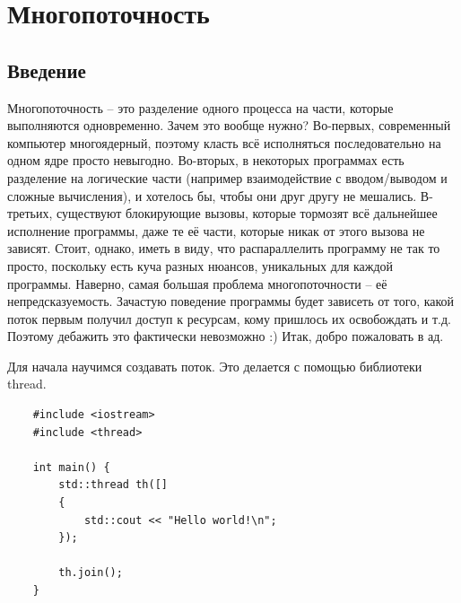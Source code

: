 \documentclass[12pt, a4paper]{article}
\begin{document}
\section{Многопоточность}
\subsection{Введение}
Многопоточность -- это разделение одного процесса на части, которые выполняются одновременно. Зачем это вообще нужно? Во-первых, современный компьютер многоядерный, поэтому класть всё исполняться последовательно на одном ядре просто невыгодно. Во-вторых, в некоторых программах есть разделение на логические части (например взаимодействие с вводом/выводом и сложные вычисления), и хотелось бы, чтобы они друг другу не мешались. В-третьих, существуют блокирующие вызовы, которые тормозят всё дальнейшее исполнение программы, даже те её части, которые никак от этого вызова не зависят. Стоит, однако, иметь в виду, что распараллелить программу не так то просто, поскольку есть куча разных нюансов, уникальных для каждой программы. 
Наверно, самая большая проблема многопоточности -- её непредсказуемость. Зачастую поведение программы будет зависеть от того, какой поток первым получил доступ к ресурсам, кому пришлось их освобождать и т.д. Поэтому дебажить это фактически невозможно :) Итак, добро пожаловать в ад.
\par Для начала научимся создавать поток. Это делается с помощью библиотеки thread.
\begin{verbatim}
	#include <iostream>
	#include <thread>
	
	int main() {
		std::thread th([]
		{
			std::cout << "Hello world!\n";
		});
		
		th.join();
	}
\end{verbatim}
\end{document}

